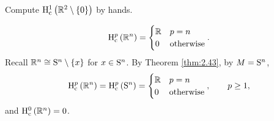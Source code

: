 \begin{exercise*}
Compute $ \H_\c^1\br{\RR^2 \setminus \cbr{0}} $ by hands.
\end{exercise*}

\begin{example}
$$ \H_\c^p\br{\RR^n} =
\begin{cases}
\RR & p = n \\
0 & \text{otherwise}
\end{cases}.
$$
Recall $ \RR^n \cong \S^n \setminus \cbr{x} $ for $ x \in \S^n $. By Theorem \ref{thm:2.43}, by $ M = \S^n $,
$$ \H_\c^p\br{\RR^n} = \H_\c^p\br{\S^n} =
\begin{cases}
\RR & p = n \\
0 & \text{otherwise}
\end{cases},
\qquad p \ge 1, $$
and $ \H_\c^0\br{\RR^n} = 0 $.
\end{example}

